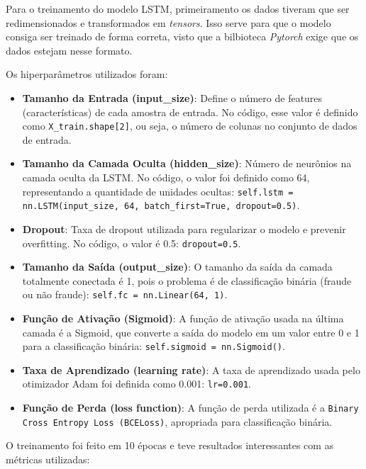 \documentclass[conference]{IEEEtran}
\begin{document}
Para o treinamento do modelo LSTM, primeiramento os dados tiveram que ser redimensionados e transformados em \textit{tensors}. Isso serve para que o modelo consiga ser treinado de forma correta, visto que a bilbioteca \textit{Pytorch} exige que os dados estejam nesse formato.

Os hiperparâmetros utilizados foram:

\begin{itemize}
    \item \textbf{Tamanho da Entrada (input\_size)}: Define o número de features (características) de cada amostra de entrada. No código, esse valor é definido como \texttt{X\_train.shape[2]}, ou seja, o número de colunas no conjunto de dados de entrada.
    
    \item \textbf{Tamanho da Camada Oculta (hidden\_size)}: Número de neurônios na camada oculta da LSTM. No código, o valor foi definido como 64, representando a quantidade de unidades ocultas: \texttt{self.lstm = nn.LSTM(input\_size, 64, batch\_first=True, dropout=0.5)}.
    
    \item \textbf{Dropout}: Taxa de dropout utilizada para regularizar o modelo e prevenir overfitting. No código, o valor é 0.5: \texttt{dropout=0.5}.
    
    \item \textbf{Tamanho da Saída (output\_size)}: O tamanho da saída da camada totalmente conectada é 1, pois o problema é de classificação binária (fraude ou não fraude): \texttt{self.fc = nn.Linear(64, 1)}.
    
    \item \textbf{Função de Ativação (Sigmoid)}: A função de ativação usada na última camada é a Sigmoid, que converte a saída do modelo em um valor entre 0 e 1 para a classificação binária: \texttt{self.sigmoid = nn.Sigmoid()}.
    
    \item \textbf{Taxa de Aprendizado (learning rate)}: A taxa de aprendizado usada pelo otimizador Adam foi definida como 0.001: \texttt{lr=0.001}.
    
    \item \textbf{Função de Perda (loss function)}: A função de perda utilizada é a \texttt{Binary Cross Entropy Loss (BCELoss)}, apropriada para classificação binária.
\end{itemize}

O treinamento foi feito em 10 épocas e teve resultados interessantes com as métricas utilizadas:
\end{document}
